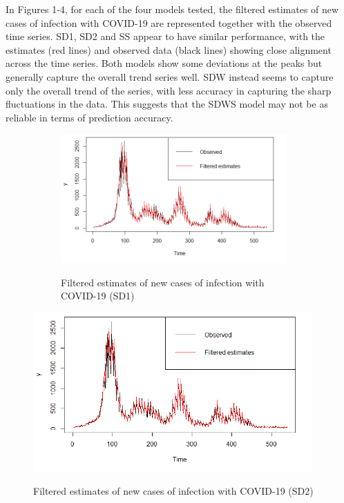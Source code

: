 In Figures 1-4, for each of the four models tested, the filtered estimates of new cases of infection with COVID-19 are represented together with the observed time series. SD1, SD2 and SS appear to have similar performance, with the estimates (red lines) and observed data (black lines) showing close alignment across the time series. Both models show some deviations at the peaks but generally capture the overall trend series well. SDW instead seems to capture only the overall trend of the series, with less accuracy in capturing the sharp fluctuations in the data. This suggests that the SDWS model may not be as reliable in terms of prediction accuracy.\\

\begin{figure}
\centering
\begin{subfigure}{\textwidth}
\caption{Filtered estimates of new cases of infection with COVID-19 (SD1)}
\includegraphics[width=0.95\textwidth, inner]{SD1_plot.png}
\label{fig:SD1}
\end{subfigure}
\begin{subfigure}
    \caption{Filtered estimates of new cases of infection with COVID-19 (SD2)}
\includegraphics[width=0.95\textwidth, inner]{SD2_plot.png}
\label{fig:SD2}
\end{subfigure}
\end{figure}

